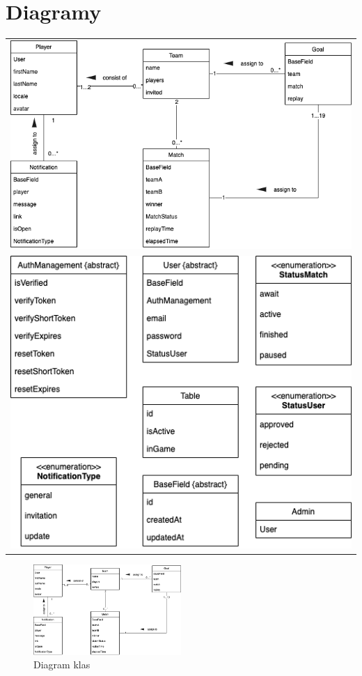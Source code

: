 \section{Diagramy}

\begin{tabular}{c}
    \includegraphics[width=\textwidth]{images/diagrams/class_diagram.png}  \\
    \includegraphics[width=\textwidth]{images/diagrams/class_diagram_rest.png}
\end{tabular}

\begin{figure}[h!]
  \centering
    \includegraphics[width=0.5\textwidth]{images/diagrams/class_diagram.png}
  \caption{Diagram klas}
  \label{fig:mobile}
\end{figure}

